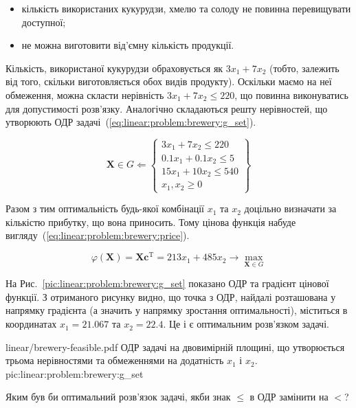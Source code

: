 \documentclass[\main/book.tex]{subfiles}
\begin{document}
\begin{itemize}
 \item кількість використаних кукурудзи, хмелю та солоду не повинна перевищувати доступної;
 \item не можна виготовити від'ємну кількість продукції.
\end{itemize}

Кількість, використаної кукурудзи обраховується як ${3 x_1 + 7 x_2}$ (тобто, залежить від того, скільки виготовляється обох видів продукту). Оскільки маємо на неї обмеження, можна скласти нерівність ${3 x_1 + 7 x_2 \leq 220}$, що повинна виконуватись для допустимості розв'язку. Аналогічно складаються решту нерівностей, що утворюють ОДР задачі~(\ref{eq:linear:problem:brewery:g_set}).

\begin{equation}
 \mathbf{X} \in G \Leftarrow \left\{\begin{array}{l}
    3 x_1 + 7 x_2 \leq 220 \\
    0.1 x_1 + 0.1 x_2 \leq 5 \\
    15 x_1 + 10 x_2 \leq 540 \\
    x_1, x_2 \geq 0
 \end{array}\right\}
 \label{eq:linear:problem:brewery:g_set}
\end{equation}

Разом з тим оптимальність будь-якої комбінації $x_1$ та $x_2$ доцільно визначати за кількістю прибутку, що вона приносить. Тому цінова функція набуде вигляду~(\ref{eq:linear:problem:brewery:price}).

\begin{equation}
 \varphi(\mathbf{X}) =
 \mathbf{X} \mathbf{c}^\mathrm{T} =
 213 x_1 + 485 x_2
 \rightarrow \max_{\mathbf{X} \in G}
 \label{eq:linear:problem:brewery:price}
\end{equation}

На Рис.~\ref{pic:linear:problem:brewery:g_set} показано ОДР та градієнт цінової функції. З отриманого рисунку видно, що точка з ОДР, найдалі розташована у напрямку градієнта (а значить у напрямку зростання оптимальності), міститься в координатах $x_1 = 21.067$ та $x_2 = 22.4$. Це і є оптимальним розв'язком задачі.

\illustration
 {linear/brewery-feasible.pdf}
 {ОДР задачі на двовимірній площині, що утворюється трьома нерівностями та обмеженнями на додатність $x_1$ і $x_2$.}
 {pic:linear:problem:brewery:g_set}
 
\begin{question}
 Яким був би оптимальний розв'язок задачі, якби знак \flqq{}$\leq$\frqq{} в ОДР замінити на \flqq$<$\frqq?
\end{question}
\end{document}
